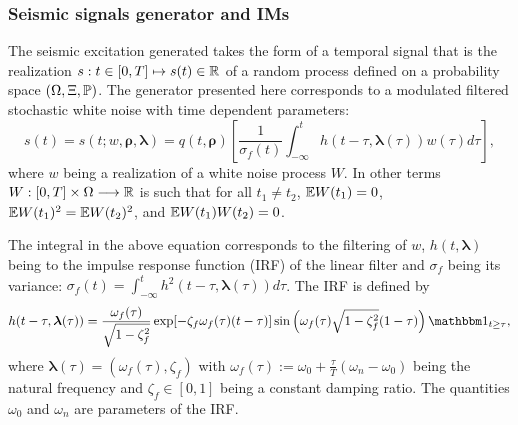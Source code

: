 


\subsubsection{Seismic signals generator and IMs}

The seismic excitation generated takes the form of a temporal signal that is the realization $s:t\in[0,T]\mapsto s(t)\in\mathbb{R}$ of a random process defined on a probability space $(\Omega,\Xi,\mathbb{P})$. The generator presented here corresponds to a modulated filtered stochastic white noise with time dependent parameters:
    \begin{equation}
        s(t)= s(t;w,\boldsymbol{\rho},\boldsymbol{\lambda}) = q(t,\boldsymbol\rho)\left[\frac{1}{\sigma_f(t)}\int_{-\infty}^t h(t-\tau,\boldsymbol\lambda(\tau))w(\tau)d\tau \right],
    \end{equation}
where $w$ being a realization of a white noise process $W$. In other terms $W:[0,T]\times\Omega\longrightarrow\mathbb{R}$ is such that for all $t_1\ne t_2$, $\mathbb{E} W(t_1)=0$, $\mathbb{E} W(t_1)^2=\mathbb{E} W(t_2)^2$, and $\mathbb{E} W(t_1)W(t_2)=0$.

The integral in the above equation corresponds to the filtering of $w$, $h(t,\boldsymbol{\lambda})$ being to the impulse response function (IRF) of the linear filter and $\sigma_f$ being its variance: $\sigma_f(t)=\int_{-\infty}^th^2(t-\tau,\boldsymbol{\lambda}(\tau))d\tau$. The IRF is defined by
    \begin{equation}
        h(t-\tau,\boldsymbol{\lambda}(\tau)) = \frac{\omega_f(\tau)}{\sqrt{1-\zeta^2_f}}\exp[-\zeta_f\omega_f(\tau)(t-\tau)]\sin\left(\omega_f(\tau)\sqrt{1-\zeta^2_f}(1-\tau)\right)\indic_{t\geq\tau},
    \end{equation}
where $\boldsymbol{\lambda}(\tau)=(\omega_f(\tau),\zeta_f) $ with $\omega_f(\tau):=\omega_0+\frac{\tau}{T}(\omega_n-\omega_0)$ being the natural frequency and $\zeta_f\in[0,1]$ being a constant damping ratio. The quantities $\omega_0$ and $\omega_n$ are parameters of the IRF.

